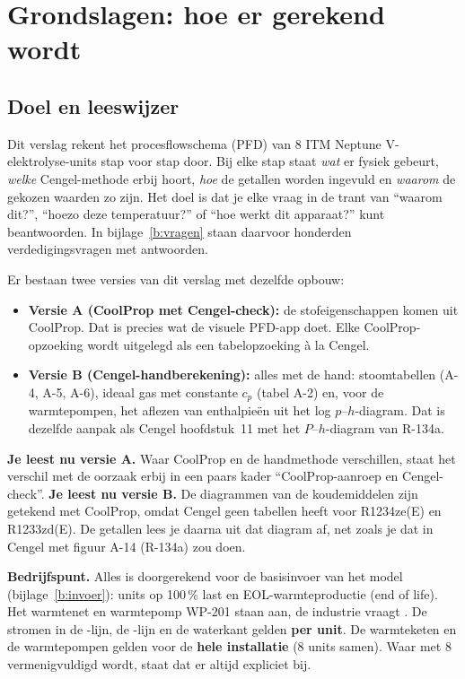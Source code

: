 \chapter{Grondslagen: hoe er gerekend wordt}
\label{h:grondslagen}

\section{Doel en leeswijzer}
Dit verslag rekent het procesflowschema (PFD) van 8 ITM Neptune V-elektrolyse-units stap voor stap door. Bij elke
stap staat \emph{wat} er fysiek gebeurt, \emph{welke} Cengel-methode erbij hoort, \emph{hoe} de getallen worden ingevuld
en \emph{waarom} de gekozen waarden zo zijn. Het doel is dat je elke vraag in de trant van ``waarom dit?'',
``hoezo deze temperatuur?'' of ``hoe werkt dit apparaat?'' kunt beantwoorden. In bijlage~\ref{b:vragen} staan
daarvoor honderden verdedigingsvragen met antwoorden.

Er bestaan twee versies van dit verslag met dezelfde opbouw:
\begin{itemize}
  \item \textbf{Versie A (CoolProp met Cengel-check):} de stofeigenschappen komen uit CoolProp. Dat is precies
        wat de visuele PFD-app doet. Elke CoolProp-opzoeking wordt uitgelegd als een tabelopzoeking à la Cengel.
  \item \textbf{Versie B (Cengel-handberekening):} alles met de hand: stoomtabellen (A-4, A-5, A-6), ideaal gas
        met constante $c_p$ (tabel A-2) en, voor de warmtepompen, het aflezen van enthalpieën uit het
        log $p$–$h$-diagram. Dat is dezelfde aanpak als Cengel hoofdstuk~11 met het $P$–$h$-diagram van R-134a.
\end{itemize}
\textbf{Je leest nu versie A.} Waar CoolProp en de handmethode verschillen, staat het verschil met de oorzaak
erbij in een paars kader ``CoolProp-aanroep en Cengel-check''.
\textbf{Je leest nu versie B.} De diagrammen van de koudemiddelen zijn getekend met CoolProp, omdat Cengel geen
tabellen heeft voor R1234ze(E) en R1233zd(E). De getallen lees je daarna uit dat diagram af, net zoals je dat
in Cengel met figuur A-14 (R-134a) zou doen.

\textbf{Bedrijfspunt.} Alles is doorgerekend voor de basisinvoer van het model (bijlage~\ref{b:invoer}):
 units op 100\,\% last en EOL-warmteproductie (end of life). Het warmtenet en
warmtepomp WP-201 staan aan, de industrie vraagt \kW. De stromen in de \OO-lijn,
de \HH-lijn en de waterkant gelden \textbf{per unit}. De warmteketen en de warmtepompen gelden voor de
\textbf{hele installatie} (8 units samen). Waar met 8 vermenigvuldigd wordt, staat dat er altijd expliciet bij.

